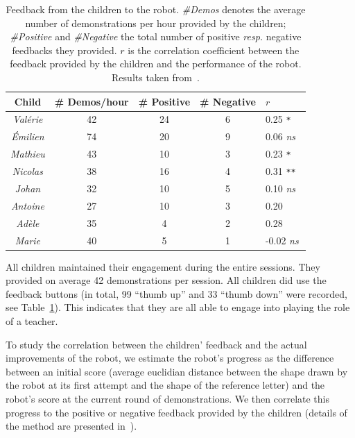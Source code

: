 \documentclass{article}
\newcommand{\resp}{\textit{resp.}\xspace}
\begin{document}
\begin{table}
    \centering
    \begin{tabular}{ccccl}
        \toprule
        \bf Child      & \bf \# Demos/hour & \bf \# Positive & \bf \# Negative & $r$ \\ \midrule
        \emph{Valérie} & 42           & 24              & 6               & 0.25 \small\tt **  \\ 
        \emph{Émilien} & 74           & 20              & 9               & 0.06 \small\it ns  \\
        \emph{Mathieu} & 43           & 10              & 3               & 0.23 \small\tt **  \\
        \emph{Nicolas} & 38           & 16              & 4               & 0.31 \small\tt *** \\
        \emph{Johan}   & 32           & 10              & 5               & 0.10 \small\it ns  \\
        \emph{Antoine} & 27           & 10              & 3               & 0.20 \small\tt *   \\
        \emph{Adèle}   & 35           & 4               & 2               & 0.28 \small\tt *   \\
        \emph{Marie}   & 40           & 5               & 1               & -0.02 \small\it ns \\ \bottomrule
    \end{tabular}
    \caption{\small Feedback from the children to the robot. \emph{\#Demos}
        denotes the average number of demonstrations per hour provided by the children;
        \emph{\#Positive} and \emph{\#Negative} the total number of positive \resp
        negative feedbacks they provided. $r$ is the correlation coefficient
        between the feedback provided by the children and the performance of the
        robot. Results taken from~\cite{jacq2016building}.}

    \label{table:scores}
\end{table}

All children maintained their engagement during the entire sessions. They
provided on average 42 demonstrations per session. All children did use the
feedback buttons (in total, 99 ``thumb up'' and 33 ``thumb down'' were recorded,
see Table~\ref{table:scores}). This indicates that they are all able to engage
into playing the role of a teacher.

To study the correlation between the children' feedback and the actual
improvements of the robot, we estimate the robot's progress as the difference
between an initial score (average euclidian distance between the shape drawn by
the robot at its first attempt and the shape of the reference letter) and the
robot's score at the current round of demonstrations. We then correlate this
progress to the positive or negative feedback provided by the children (details
of the method are presented in~\cite{jacq2016building}).
\end{document}
